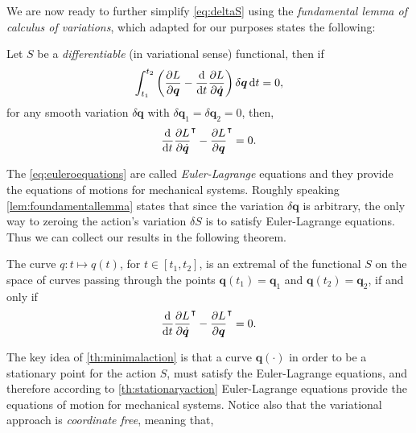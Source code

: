 		
		We are now ready to further simplify \cref{eq:deltaS} using the 
		\emph{fundamental lemma of calculus of variations}, which adapted
		for our purposes states the following:
		\begin{lemma}
			\label{lem:foundamentallemma}
			Let $S$ be a \emph{differentiable} (in variational sense) functional, then if
			\begin{equation}
				\int_{t_{1}}^{t_{2}}\left(\frac{\partial L}{\partial \bm{q}}
				-\frac{\mathop{}\!\mathrm{d}}{\mathop{}\!\mathrm{d} t}\frac{\partial L}{\partial\dot{\bm{q}}}\right)\delta \bm{q}\mathop{}\!\mathrm{d} t = 0,
			\end{equation}
			for any smooth variation $\delta\bm{q}$ with $\delta\bm{q}_{1}=\delta\bm{q}_{2}=0$, then, 
			\begin{equation}
				\label{eq:euleroequations}
				\frac{\mathop{}\!\mathrm{d}}{\mathop{}\!\mathrm{d} t}\frac{\partial L}{\partial\dot{\bm{q}}}^{\intercal}
				-\frac{\partial L}{\partial \bm{q}}^{\intercal} = 0.
			\end{equation}
		\end{lemma}	
		The \cref{eq:euleroequations} are called \emph{Euler-Lagrange} equations and they
		provide the equations of motions for mechanical systems.
		Roughly speaking \cref{lem:foundamentallemma} states that since the variation
		$\delta\bm{q}$ is arbitrary, the only way to zeroing the action's
		variation $\delta S$ is to satisfy Euler-Lagrange equations.
		Thus we can collect our results in the following theorem.
		\begin{theorem}
			\label{th:minimalaction}
			The curve $q:t\mapsto q(t)$, for $t\in[t_{1},t_{2}]$, 
			is an extremal of the functional $S$ on the space of curves passing
			through the points $\bm{q}(t_{1}) =\bm{q}_{1}$ and $\bm{q}(t_{2}) = \bm{q}_{2}$,
			if and only if
			\begin{equation}
				\frac{\mathop{}\!\mathrm{d}}{\mathop{}\!\mathrm{d} t}\frac{\partial L}{\partial\dot{\bm{q}}}^{\intercal}
				-\frac{\partial L}{\partial \bm{q}}^{\intercal} = 0.
			\end{equation}
		\end{theorem}
		The key idea of \cref{th:minimalaction} is that a curve $\bm{q}(\cdot)$ in order 
		to be a stationary point for the action $S$, must satisfy the Euler-Lagrange equations,
		and therefore according to \cref{th:stationaryaction} Euler-Lagrange equations
		provide the equations of motion for mechanical systems.
		Notice also that the variational approach is \emph{coordinate free}, meaning that,
